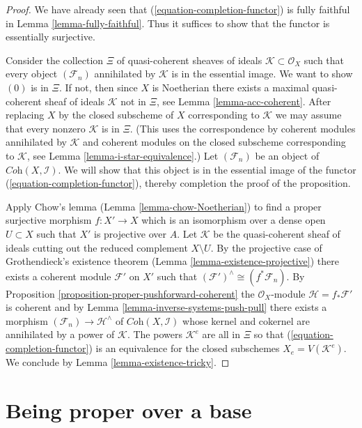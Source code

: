 \documentclass[10pt,a4paper]{amsart}
\theoremstyle{plain}
\theoremstyle{definition}
\theoremstyle{remark}
\numberwithin{equation}{subsection}
\begin{document}
\begin{proof}
We have already seen that (\ref{equation-completion-functor}) is
fully faithful in Lemma \ref{lemma-fully-faithful}. Thus it suffices
to show that the functor is essentially surjective.

\medskip\noindent
Consider the collection $\Xi$ of quasi-coherent sheaves of ideals
$\mathcal{K} \subset \mathcal{O}_X$ such that every object
$(\mathcal{F}_n)$ annihilated by $\mathcal{K}$ is in the essential image.
We want to show $(0)$ is in $\Xi$. If not, then since $X$ is Noetherian
there exists a maximal quasi-coherent sheaf of ideals $\mathcal{K}$
not in $\Xi$, see
Lemma \ref{lemma-acc-coherent}.
After replacing $X$ by the closed subscheme of $X$
corresponding to $\mathcal{K}$ we may assume that every nonzero
$\mathcal{K}$ is in $\Xi$. (This uses the correspondence by
coherent modules annihilated by $\mathcal{K}$ and coherent modules
on the closed subscheme corresponding to $\mathcal{K}$, see
Lemma \ref{lemma-i-star-equivalence}.)
Let $(\mathcal{F}_n)$ be an object of
$\textit{Coh}(X, \mathcal{I})$.
We will show that this object is in the essential image of the
functor (\ref{equation-completion-functor}), thereby completion the
proof of the proposition.

\medskip\noindent
Apply Chow's lemma (Lemma \ref{lemma-chow-Noetherian}) to find a
proper surjective morphism $f : X' \to X$ which is an isomorphism
over a dense open $U \subset X$ such that $X'$ is projective over $A$.
Let $\mathcal{K}$ be the quasi-coherent sheaf of ideals cutting
out the reduced complement $X \setminus U$. By the projective
case of Grothendieck's existence theorem
(Lemma \ref{lemma-existence-projective})
there exists a coherent module $\mathcal{F}'$ on $X'$ such
that $(\mathcal{F}')^\wedge \cong (f^*\mathcal{F}_n)$. By
Proposition \ref{proposition-proper-pushforward-coherent}
the $\mathcal{O}_X$-module $\mathcal{H} = f_*\mathcal{F}'$ is coherent
and by Lemma \ref{lemma-inverse-systems-push-pull}
there exists a morphism $(\mathcal{F}_n) \to \mathcal{H}^\wedge$
of $\textit{Coh}(X, \mathcal{I})$ whose kernel and cokernel are
annihilated by a power of $\mathcal{K}$. The powers $\mathcal{K}^e$
are all in $\Xi$ so that (\ref{equation-completion-functor})
is an equivalence for the closed subschemes $X_e = V(\mathcal{K}^e)$.
We conclude by Lemma \ref{lemma-existence-tricky}.
\end{proof}





\section{Being proper over a base}
\label{section-proper-over-base}
\end{document}
